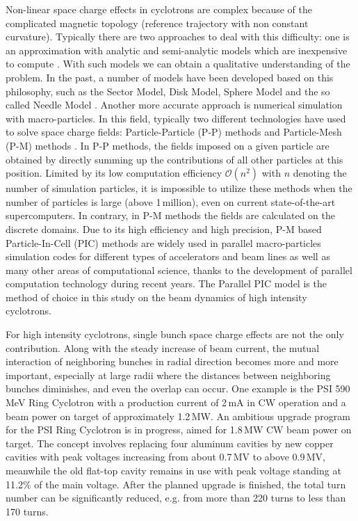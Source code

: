 \documentclass[aps,prstab,onecolumn,superscriptaddress,showpacs]{revtex4}
\begin{document}
Non-linear space charge effects in cyclotrons are complex because of the complicated magnetic topology (reference trajectory with non constant
curvature). Typically there are two approaches 
to deal with this difficulty: one is an approximation with analytic and semi-analytic models which are inexpensive to compute \cite{Bert:2001} \cite{kleeven:1}. With such models we can obtain a qualitative  
understanding of the problem. %
In the past, a number of models have been developed based on this philosophy, such as the Sector Model, Disk Model, Sphere Model and the so called Needle Model \cite{Gordon:1,Joho:1,Adam:1,Adam:2}. 
Another more accurate approach is numerical simulation with macro-particles. In this field, typically two different technologies have used to 
solve space charge fields: Particle-Particle (P-P) methods \cite{Li:1} and Particle-Mesh (P-M) methods \cite{Ada:1,Poz:1}. In P-P methods, the fields imposed on 
a given particle are obtained by directly summing up the contributions of all other particles at this position. Limited by its low computation efficiency $\mathcal{O}(n^2)$ with $n$ denoting the number of simulation particles, 
it is impossible to utilize these methods when the number of particles is large (above 1\,million), even on current state-of-the-art supercomputers. In contrary, in P-M methods
the fields are calculated on the discrete domains. Due to its high efficiency and high precision, P-M based Particle-In-Cell (PIC) methods \cite{Hockney:1} 
are widely used in parallel macro-particles simulation codes for different types of accelerators and beam lines \cite{Ada:1,Qiang:1,Gala:1,Grote:1,Huang:1} 
as well as many other areas of computational science, thanks to the development of parallel computation technology during recent years. 
The Parallel PIC model is the method of choice in this study on the beam dynamics of high intensity cyclotrons.

For high intensity cyclotrons, single bunch space charge effects are not the only contribution. 
Along with the steady increase of beam current, the mutual interaction of neighboring bunches in radial direction 
becomes more and more important, especially at large radii where the distances between neighboring bunches diminishes, and even the overlap can occur.
One example is the PSI 590\,MeV Ring Cyclotron \cite{Mike:1} with a production current of 2\,mA in CW operation and a beam power on target of approximately 1.2\,MW.
An ambitious upgrade program for the PSI Ring Cyclotron is in progress, aimed for 1.8\,MW CW beam power on target. 
The concept involves replacing four aluminum cavities by new copper cavities with peak voltages
increasing from about 0.7\,MV to above 0.9\,MV, meanwhile the old flat-top cavity remains in use with peak voltage standing at 11.2$\%$ of the main voltage.
 After the planned upgrade is finished, the total turn number can be significantly reduced, e.g. from more than 220 turns to less than 
170 turns.
\end{document}
